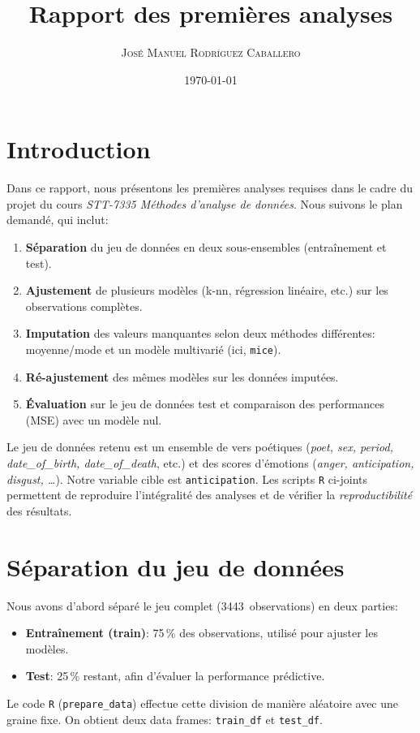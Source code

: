 \documentclass[11pt]{article}
\title{\textbf{Rapport des premières analyses}}
\author{%
	\textsc{José Manuel Rodríguez Caballero} 
}%
\date{\today}
\begin{document}
	\maketitle
	\tableofcontents
	
	\section{Introduction}
	Dans ce rapport, nous présentons les premières analyses requises dans le cadre du projet du cours \emph{STT-7335 Méthodes d'analyse de données}. Nous suivons le plan demandé, qui inclut:
	
	\begin{enumerate}
		\item \textbf{Séparation} du jeu de données en deux sous-ensembles (entraînement et test).
		\item \textbf{Ajustement} de plusieurs modèles (k-nn, régression linéaire, etc.) sur les observations complètes.
		\item \textbf{Imputation} des valeurs manquantes selon deux méthodes différentes: moyenne/mode et un modèle multivarié (ici, \texttt{mice}).
		\item \textbf{Ré-ajustement} des mêmes modèles sur les données imputées.
		\item \textbf{Évaluation} sur le jeu de données test et comparaison des performances (MSE) avec un modèle nul.
	\end{enumerate}
	
	Le jeu de données retenu est un ensemble de vers poétiques (\emph{poet, sex, period, date\_of\_birth, date\_of\_death}, etc.) et des scores d'émotions (\emph{anger, anticipation, disgust, \dots}). Notre variable cible est \texttt{anticipation}. Les scripts \texttt{R} ci-joints permettent de reproduire l'intégralité des analyses et de vérifier la \emph{reproductibilité} des résultats.
	
	\section{Séparation du jeu de données}
	Nous avons d'abord séparé le jeu complet (3443~observations) en deux parties:
	\begin{itemize}
		\item \textbf{Entraînement (train)}: 75\,\% des observations, utilisé pour ajuster les modèles.
		\item \textbf{Test}: 25\,\% restant, afin d'évaluer la performance prédictive.
	\end{itemize}
	Le code \texttt{R} (\texttt{prepare\_data}) effectue cette division de manière aléatoire avec une graine fixe. On obtient deux data frames: \texttt{train\_df} et \texttt{test\_df}.
	
\end{document}
